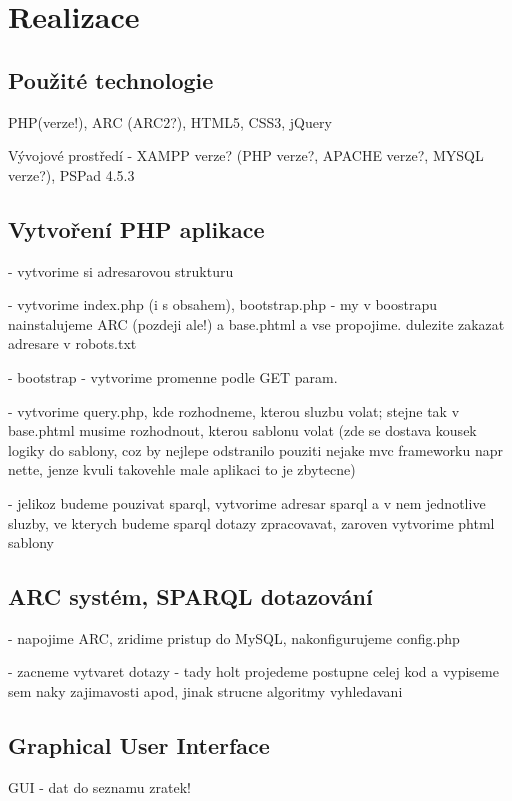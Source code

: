 \chapter{Realizace}
\label{chapter:implementation}

\section{Použité technologie}
PHP(verze!), ARC (ARC2?), HTML5, CSS3, jQuery

Vývojové prostředí - XAMPP verze? (PHP verze?, APACHE verze?, MYSQL verze?), PSPad 4.5.3

\section{Vytvoření PHP aplikace}
 
- vytvorime si adresarovou strukturu

- vytvorime index.php (i s obsahem), bootstrap.php - my v boostrapu nainstalujeme ARC (pozdeji ale!) a base.phtml a vse propojime. dulezite zakazat adresare v robots.txt

- bootstrap - vytvorime promenne podle GET param.

- vytvorime query.php, kde rozhodneme, kterou sluzbu volat; stejne tak v base.phtml musime rozhodnout, kterou sablonu volat (zde se dostava kousek logiky do sablony, coz by nejlepe odstranilo pouziti nejake mvc frameworku napr nette, jenze kvuli takovehle male aplikaci to je zbytecne)

- jelikoz budeme pouzivat sparql, vytvorime adresar sparql a v nem jednotlive sluzby, ve kterych budeme sparql dotazy zpracovavat, zaroven vytvorime phtml sablony

\section{ARC systém, SPARQL dotazování}

- napojime ARC, zridime pristup do MySQL, nakonfigurujeme config.php

- zacneme vytvaret dotazy - tady holt projedeme postupne celej kod a vypiseme sem naky zajimavosti apod, jinak strucne algoritmy vyhledavani

\section{Graphical User Interface}
GUI - dat do seznamu zratek!

